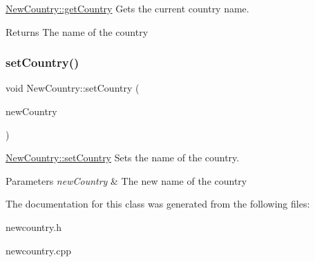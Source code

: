 \hyperlink{class_new_country_a5d28702b9788a1debf6817443d4a7355}{New\+Country\+::get\+Country} Gets the current country name. 

\begin{DoxyReturn}{Returns}
The name of the country 
\end{DoxyReturn}
\mbox{\label{class_new_country_af6fed97011d536e1a29db8112849e36b}} 
\subsubsection{\texorpdfstring{set\+Country()}{setCountry()}}
{\footnotesize\ttfamily void New\+Country\+::set\+Country (\begin{DoxyParamCaption}\item[{Q\+String}]{new\+Country }\end{DoxyParamCaption})}



\hyperlink{class_new_country_af6fed97011d536e1a29db8112849e36b}{New\+Country\+::set\+Country} Sets the name of the country. 


\begin{DoxyParams}{Parameters}
{\em new\+Country} & The new name of the country \\
\hline
\end{DoxyParams}


The documentation for this class was generated from the following files\+:\begin{DoxyCompactItemize}
\item 
newcountry.\+h\item 
newcountry.\+cpp\end{DoxyCompactItemize}

